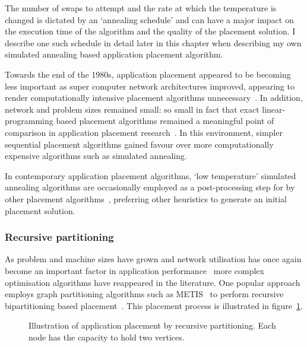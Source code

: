 				The number of swaps to attempt and the rate at which the temperature is
				changed is dictated by an `annealing schedule' and can have a major
				impact on the execution time of the algorithm and the quality of the
				placement solution. I describe one such schedule in detail later in
				this chapter when describing my own simulated annealing based
				application placement algorithm.
				
				Towards the end of the 1980s, application placement appeared to be
				becoming less important as super computer network architectures
				improved, appearing to render computationally intensive placement
				algorithms unnecessary~\cite{dally87}.  In addition, network and
				problem sizes remained small: so small in fact that exact
				linear-programming based placement algorithms remained a meaningful
				point of comparison in application placement research~\cite{xu91}. In
				this environment, simpler sequential placement algorithms gained favour
				over more computationally expensive algorithms such as simulated
				annealing.
				
				In contemporary application placement algorithms, `low temperature'
				simulated annealing algorithms are occasionally employed as a
				post-processing step for by other placement
				algorithms~\cite{hoefler11}, preferring other heuristics to generate an
				initial placement solution.
				
			
			\subsubsection{Recursive partitioning}
				
				As problem and machine sizes have grown and network utilisation has
				once again become an important factor in application
				performance~\cite{navaridas09b} more complex optimisation algorithms
				have reappeared in the literature. One popular approach employs graph
				partitioning algorithms such as METIS~\cite{karypis98} to perform
				recursive bipartitioning based
				placement~\cite{phillips14,hoefler11,pellegrini96}.  This placement
				process is illustrated in figure~\ref{fig:partitioning}.
				
				\begin{figure}
					\center
					
					\caption[Application placement by recursive partitioning.]%
					{Illustration of application placement by recursive
					partitioning. Each node has the capacity to hold two vertices.}
					\label{fig:partitioning}
				\end{figure}
				
